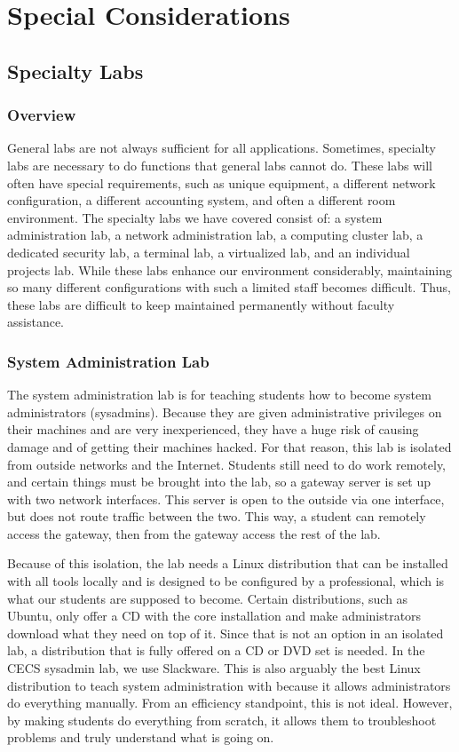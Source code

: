 \chapter{Special Considerations} \label{ch:special_considerations}
\section{Specialty Labs} \label{sec:specialty_labs}
\subsection{Overview}
General labs are not always sufficient for all applications.  Sometimes, specialty labs are necessary to do functions that general labs cannot do.  These labs will often have special requirements, such as unique equipment, a different network configuration, a different accounting system, and often a different room environment.  The specialty labs we have covered consist of:  a system administration lab, a network administration lab, a computing cluster lab, a dedicated security lab, a terminal lab, a virtualized lab, and an individual projects lab. While these labs enhance our environment considerably, maintaining so many different configurations with such a limited staff becomes difficult. Thus, these labs are difficult to keep maintained permanently without faculty assistance.  
\subsection{System Administration Lab}
The system administration lab is for teaching students how to become system administrators (sysadmins).  Because they are given administrative privileges on their machines and are very inexperienced, they have a huge risk of causing damage and of getting their machines hacked.  For that reason, this lab is isolated from outside networks and the Internet.  Students still need to do work remotely, and certain things must be brought into the lab, so a gateway server is set up with two network interfaces.  This server is open to the outside via one interface, but does not route traffic between the two.  This way, a student can remotely access the gateway, then from the gateway access the rest of the lab.  

Because of this isolation, the lab needs a Linux distribution that can be installed with all tools locally and is designed to be configured by a professional, which is what our students are supposed to become.  Certain distributions, such as Ubuntu, only offer a CD with the core installation and make administrators download what they need on top of it.  Since that is not an option in an isolated lab, a distribution that is fully offered on a CD or DVD set is needed.  In the CECS sysadmin lab, we use Slackware.  This is also arguably the best Linux distribution to teach system administration with because it allows administrators do everything manually.  From an efficiency standpoint, this is not ideal.  However, by making students do everything from scratch, it allows them to troubleshoot problems and truly understand what is going on.  


